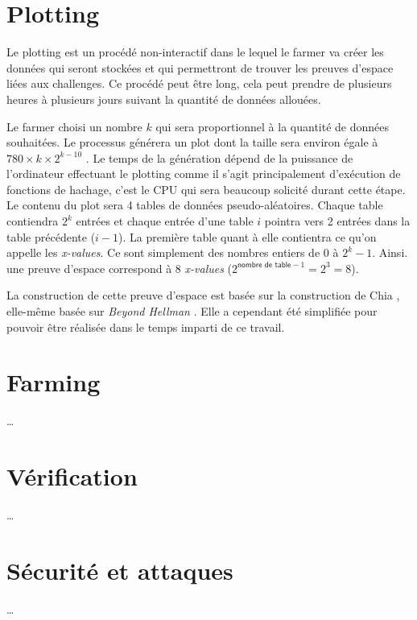 \documentclass[../tb_report.tex]{subfiles}
\begin{document}
\section{Plotting}

Le plotting est un procédé non-interactif dans le lequel le farmer va créer les données qui seront stockées et qui permettront de trouver les preuves d'espace liées aux challenges. Ce procédé peut être long, cela peut prendre de plusieurs heures à plusieurs jours suivant la quantité de données allouées.

Le farmer choisi un nombre $k$ qui sera proportionnel à la quantité de données souhaitées. Le processus générera un plot dont la taille sera environ égale à $780 \times k \times 2^{k-10}$ \cite{chia:consensus}. Le temps de la génération dépend de la puissance de l'ordinateur effectuant le plotting comme il s'agit principalement d'exécution de fonctions de hachage, c'est le CPU qui sera beaucoup solicité durant cette étape. Le contenu du plot sera 4 tables de données pseudo-aléatoires. Chaque table contiendra $2^k$ entrées et chaque entrée d'une table $i$ pointra vers 2 entrées dans la table précédente ($i-1$). La première table quant à elle contientra ce qu'on appelle les \emph{x-values}. Ce sont simplement des nombres entiers de $0$ à $2^k-1$. Ainsi. une preuve d'espace correspond à 8 \emph{x-values} ($2^{\textsf{nombre de table} - 1} = 2^3 = 8$).

La construction de cette preuve d'espace est basée sur la construction de Chia \cite{chia:construction}, elle-même basée sur \emph{Beyond Hellman} \cite{DBLP:conf/asiacrypt/AbusalahACKPR17}. Elle a cependant été simplifiée pour pouvoir être réalisée dans le temps imparti de ce travail.

\section{Farming}

\dots

\section{Vérification}

\dots

\section{Sécurité et attaques}

\dots
\end{document}

